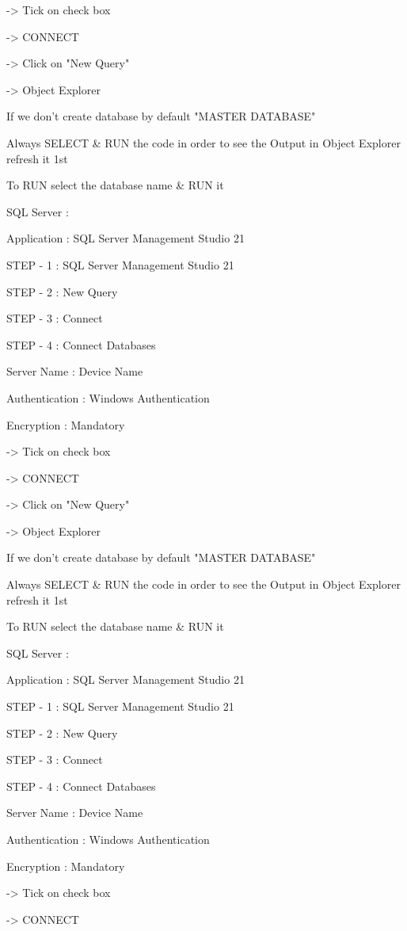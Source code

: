-> Tick on check box

-> CONNECT

-> Click on "New Query"

-> Object Explorer


If we don't create database by default "MASTER DATABASE"


Always SELECT & RUN the code in order to see the Output in Object Explorer refresh it 1st


To RUN select the database name & RUN it

SQL Server :

Application : SQL Server Management Studio 21

STEP - 1 : SQL Server Management Studio 21

STEP - 2 : New Query

STEP - 3 : Connect

STEP - 4 : Connect Databases


Server Name : Device Name

Authentication : Windows Authentication

Encryption : Mandatory

-> Tick on check box

-> CONNECT

-> Click on "New Query"

-> Object Explorer


If we don't create database by default "MASTER DATABASE"


Always SELECT & RUN the code in order to see the Output in Object Explorer refresh it 1st


To RUN select the database name & RUN it

SQL Server :

Application : SQL Server Management Studio 21

STEP - 1 : SQL Server Management Studio 21

STEP - 2 : New Query

STEP - 3 : Connect

STEP - 4 : Connect Databases


Server Name : Device Name

Authentication : Windows Authentication

Encryption : Mandatory

-> Tick on check box

-> CONNECT

